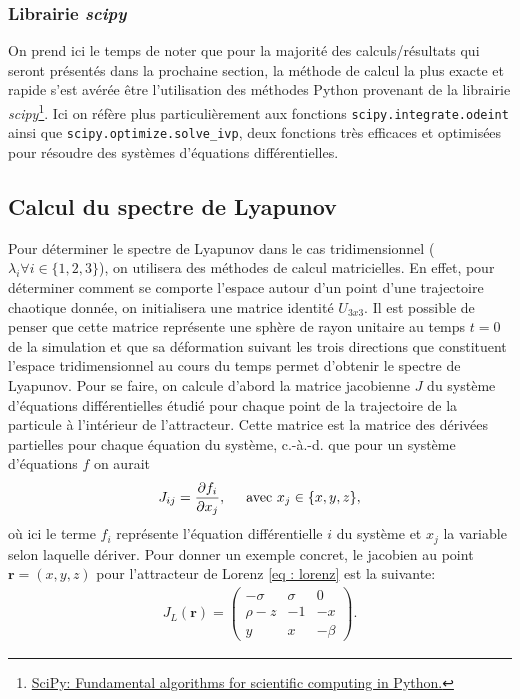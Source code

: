     \subsubsection{Librairie \textit{scipy}} \label{subsubsec: scipy}
    On prend ici le temps de noter que pour la majorité des calculs/résultats
    qui seront présentés dans la prochaine section, la méthode de calcul la
    plus exacte et rapide s'est avérée être l'utilisation des méthodes Python
    provenant de la librairie
    \textit{scipy}\footnote{\href{https://scipy.org/}{SciPy: Fundamental
    algorithms for scientific computing in Python.}}. Ici on  réfère plus
    particulièrement aux fonctions \texttt{scipy.integrate.odeint} ainsi
    que \texttt{scipy.optimize.solve\_ivp}, deux fonctions très efficaces et
    optimisées pour résoudre des systèmes d'équations différentielles.

\subsection{Calcul du spectre de Lyapunov} \label{subsec: lyapunov_compute}
    Pour déterminer le spectre de Lyapunov dans le cas tridimensionnel
    ($\lambda_i\forall i\in\{1, 2, 3\}$), on utilisera des méthodes de calcul
    matricielles. En effet, pour déterminer comment se comporte l'espace autour
    d'un point d'une trajectoire chaotique donnée, on initialisera une matrice
    identité $U_{3x3}$. Il est possible de penser que cette matrice représente
    une sphère de rayon unitaire au temps $t=0$ de la simulation et que sa
    déformation suivant les trois directions que constituent l'espace
    tridimensionnel au cours du temps permet d'obtenir le spectre de Lyapunov.
    Pour se faire, on calcule d'abord la matrice jacobienne $J$ du système
    d'équations différentielles étudié pour chaque point de la trajectoire de
    la particule à l'intérieur de l'attracteur. Cette matrice est la matrice
    des dérivées partielles pour chaque équation du système, c.-à.-d. que pour
    un système d'équations $f$ on aurait
    \begin{align*}
        J_{ij} =
        \frac{\partial f_i}{\partial x_j},\hspace{0.5cm}\text{avec }x_j\in\{x, y, z\},
    \end{align*}
    où ici le terme $f_i$ représente l'équation différentielle $i$ du système
    et $x_j$ la variable selon laquelle dériver. Pour donner un exemple
    concret, le jacobien au point $\bm{r} = (x, y, z)$ pour l'attracteur de
    Lorenz \eqref{eq : lorenz} est la suivante:
    \begin{align*}
        J_L(\bm{r}) =
        \begin{pmatrix}
            -\sigma & \sigma & 0 \\
            \rho - z & -1 & -x \\
            y & x & -\beta
        \end{pmatrix}.
    \end{align*}

